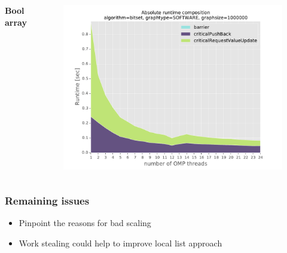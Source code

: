 \begin{frame}
\begin{columns}[T]
  \bfseries{Bool array}
  \begin{figure}[!ht]
    \begin{center}
      \includegraphics[width=\textwidth]{img/timeabs_bitset_gtSOFTWARE_s1000000_opt1.pdf}
    \end{center}
  \end{figure}
\end{columns}
 
\end{frame}



\begin{frame}
 \frametitle{Remaining issues}
 \begin{itemize}
	 \item Pinpoint the reasons for bad scaling
	 \item Work stealing could help to improve local list approach
 \end{itemize}
\end{frame}


 
